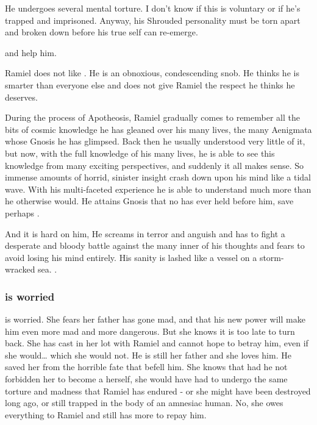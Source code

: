 He undergoes several mental torture. I don't know if this is voluntary or if he's trapped and imprisoned. Anyway, his Shrouded personality must be torn apart and broken down before his true self can re-emerge. 

\Cishiel{} and \Gilchad{} help him. 

Ramiel does not like \Gilchad. 
He is an obnoxious, condescending snob. 
He thinks he is smarter than everyone else and does not give Ramiel the respect he thinks he deserves. 

During the process of Apotheosis, Ramiel gradually comes to remember all the bits of cosmic knowledge he has gleaned over his many lives, the many Aenigmata whose Gnosis he has glimpsed. 
Back then he usually understood very little of it, but now, with the full knowledge of his many lives, he is able to see this knowledge from many exciting perspectives, and suddenly it all makes sense.
So immense amounts of horrid, sinister insight crash down upon his mind like a tidal wave.
With his multi-faceted experience he is able to understand much more than he otherwise would.
He attains Gnosis that no \resphan has ever held before him, save perhaps \Azraid.

And it is hard on him,
He screams in terror and anguish and has to fight a desperate and bloody battle against the many inner \daemons of his thoughts and fears to avoid losing his mind entirely.
His sanity is lashed like a vessel on a storm-wracked sea.
. 





\subsubsection{\Cishiel is worried}
\Cishiel is worried.
She fears her father has gone mad, and that his new power will make him even more mad and more dangerous.
But she knows it is too late to turn back.
She has cast in her lot with Ramiel and cannot hope to betray him, even if she would\ldots{} which she would not.
He is still her father and she loves him. 
He saved her from the horrible fate that befell him.
She knows that had he not forbidden her to become a \malach herself, she would have had to undergo the same torture and madness that Ramiel has endured - or she might have been destroyed long ago, or still trapped in the body of an amnesiac human.
No, she owes everything to Ramiel and still has more to repay him.

